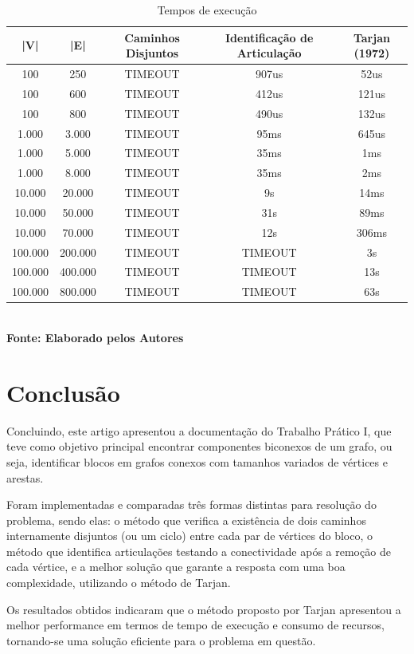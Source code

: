 \begin{table}[htb]
	\centering
	\caption{\hspace{0.1cm} Tempos de execução}
	\vspace{-0.3cm} %
	\label{tab:tabela1}
	\begin{tabular}{c|c|c|c|c}
  \hline
    \textbf{|V|} & \textbf{|E|} & \textbf{Caminhos Disjuntos} &  \textbf{Identificação de Articulação}	& \textbf{Tarjan (1972)}\\
    \hline
    100 & 250 & TIMEOUT & 907us & 52us \\
    100 & 600 & TIMEOUT & 412us & 121us \\
    100 & 800 & TIMEOUT & 490us & 132us \\
    1.000 & 3.000 & TIMEOUT & 95ms & 645us \\
    1.000 & 5.000 & TIMEOUT & 35ms & 1ms \\
    1.000 & 8.000 & TIMEOUT & 35ms & 2ms \\
    10.000 & 20.000 & TIMEOUT & 9s & 14ms \\
    10.000 & 50.000 & TIMEOUT & 31s & 89ms \\
    10.000 & 70.000 & TIMEOUT & 12s & 306ms \\
    100.000 & 200.000 & TIMEOUT & TIMEOUT & 3s \\
    100.000 & 400.000 & TIMEOUT & TIMEOUT & 13s \\
    100.000 & 800.000 & TIMEOUT & TIMEOUT & 63s \\ 
     \hline
 \end{tabular}
 	\vspace{.1cm}  %
	\small
	{\footnotesize\\ \textbf{Fonte: Elaborado pelos Autores}}
\end{table}

\pagebreak

\section{\esp Conclusão}
Concluindo, este artigo apresentou a documentação do Trabalho Prático I, que teve como objetivo principal encontrar componentes biconexos de um grafo, ou seja, identificar blocos em grafos conexos com tamanhos variados de vértices e arestas.

Foram implementadas e comparadas três formas distintas para resolução do problema, sendo elas: o método que verifica a existência de dois caminhos internamente disjuntos (ou um ciclo) entre cada par de vértices do bloco, o método que identifica articulações testando a conectividade após a remoção de cada vértice, e a melhor solução que garante a resposta com uma boa complexidade, utilizando o método de Tarjan.

Os resultados obtidos indicaram que o método proposto por Tarjan apresentou a melhor performance em termos de tempo de execução e consumo de recursos, tornando-se uma solução eficiente para o problema em questão.

